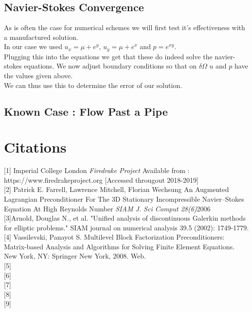 \documentclass[11pt,twoside,a4paper]{article}
\begin{document}
\subsection{Navier-Stokes Convergence}

As is often the case for numerical schemes we will first test it's effectiveness with a manufactured solution.\\
In our case we used $u_x = \mu  + e^y$, $u_y = \mu + e^x$ and $p = e^{xy}$.\\
Plugging this into the equations we get that these do indeed solve the navier-stokes equations. We now adjust boundary conditions so that on $\delta \Omega$ $u$ and $p$ have the values given above.\\
We can thus use this to determine the error of our solution.

\subsection{Known Case : Flow Past a Pipe}
\section{Citations}

[1] Imperial College London \textit{Firedrake Project} Available from : https://www.firedrakeproject.org [Accessed througout 2018-2019]\\

[2] Patrick E. Farrell, Lawrence Mitchell, Florian Wechsung
 An Augmented Lagrangian Preconditioner For The 3D Stationary Incompressible Navier–Stokes Equation At High Reynolds Number
\textit{SIAM J. Sci Comput 28(6)}2006\\

[3]Arnold, Douglas N., et al. "Unified analysis of discontinuous Galerkin methods for elliptic problems." SIAM journal on numerical analysis 39.5 (2002): 1749-1779.\\

[4] Vassilevski, Panayot S. Multilevel Block Factorization Preconditioners: Matrix-based Analysis and Algorithms for Solving Finite Element Equations. New York, NY: Springer New York, 2008. Web.\\

[5]\\

[6]\\

[7]\\

[8]\\

[9]
\end{document}
